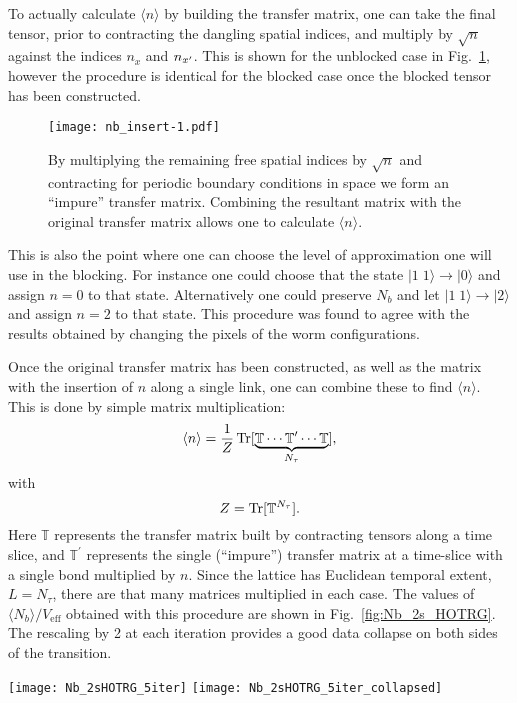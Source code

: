 \documentclass[../main.tex]{subfiles}
\begin{document}
To actually calculate $\langle n \rangle$ by building the transfer matrix, one
can take the final tensor, prior to contracting the dangling spatial indices,
and multiply by $\sqrt{n}$ against the indices $n_{x}$ and $n_{{x^{\prime}}}$.
%
This is shown for the unblocked case in Fig.~\ref{fig:nb}, however the
procedure is identical for the blocked case once the blocked tensor has been
constructed.
%
\begin{figure}[htpb]
  \centering
	\texttt{[image: nb\_insert-1.pdf]}
    \caption{By multiplying the remaining free spatial indices by $\sqrt{n}$
    and contracting for periodic boundary conditions in space we form an
    ``impure'' transfer matrix.  Combining the resultant matrix with the
    original transfer matrix allows one to calculate $\langle n \rangle$.}%
\label{fig:nb}
\end{figure}
%
This is also the point where one can choose the level of approximation one will
use in the blocking.
%
For instance one could choose that the state $|1 \; 1 \rangle \rightarrow
|0\rangle$ and assign $n = 0$ to that state.
%
Alternatively one could preserve $N_{b}$ and let $|1 \; 1 \rangle \rightarrow
|2 \rangle$ and assign $n = 2$ to that state.
%
This procedure was found to agree with the results obtained by changing the
pixels of the worm configurations.

Once the original transfer matrix has been constructed, as well as the matrix
with the insertion of $n$ along a single link, one can combine these to find
$\langle n \rangle$.
%
This is done by simple matrix multiplication:
%
\begin{equation}
    \langle n \rangle = \frac{1}{Z} \operatorname{Tr}[\underbrace{\mathbb{T} \cdots
    \mathbb{T}^{\prime} \cdots \mathbb{T}}_{N_{\tau}}],
\end{equation}
%
with
%
\begin{equation}
	Z = \operatorname{Tr}[\mathbb{T}^{N_{\tau}}].
\end{equation}
%
Here $\mathbb{T}$ represents the transfer matrix built by contracting tensors
along a time slice, and $\mathbb{T}^{\prime}$ represents the single
(``impure'') transfer matrix at a time-slice with a single bond multiplied by
$n$.
%
Since the lattice has Euclidean temporal extent, $L = N_{\tau}$, there are that
many matrices multiplied in each case.
%
The values of $\langle N_b\rangle/V_{\mathrm{eff}}$ obtained with this
procedure are shown in Fig.~\ref{fig:Nb_2s_HOTRG}.
%
The rescaling by 2 at each iteration provides a good data collapse on both
sides of the transition.
%
\begin{figure*}[htpb]
    \centering 
    \texttt{[image: Nb\_2sHOTRG\_5iter]}\hfill%
    \texttt{[image: Nb\_2sHOTRG\_5iter\_collapsed]}
    \caption{(a) $\langle N_b\rangle$ vs $(T - 2.46)$ under successive blocking
      steps calculated using 2-state HOTRG.\@ (b) $\langle N_b\rangle$ vs $(T -
      2.46) / L_{\mathrm{eff}}$ under successive blocking steps calculated
      using 2-state HOTRG.\@ Note that the value of $2.46$ was determined
      qualitatively by choosing the value which gave the best resulting data
      collapse.}%
\label{fig:Nb_2s_HOTRG}
\end{figure*}
%
\end{document}
